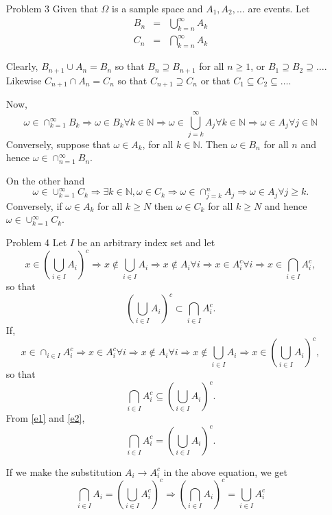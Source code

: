 \documentclass{article}
\newcommand{\son}{\mathbb{N}}
\begin{document}
\begin{enumerate}
\item[Problem 3] Given that $\Omega$ is a sample space and $A_1, A_2, \ldots$ are
events. Let
\begin{eqnarray*}
B_n &=& \bigcup_{k=n}^\infty A_k \\
C_n &=& \bigcap_{k=n}^\infty A_k
\end{eqnarray*}

Clearly, $B_{n+1} \cup A_{n} = B_{n}$ so that $B_n \supseteq B_{n+1}$ for all $n
\ge 1$, or $B_1 \supseteq B_2 \supseteq \ldots$. Likewise $C_{n+1} \cap A_{n} = 
C_n$ so that $C_{n+1} \supseteq C_n$ or that $C_1 \subseteq C_2 \subseteq \ldots$.

Now,
\[
\omega \in \cap_{k=1}^\infty B_k \Rightarrow \omega \in B_k \forall k \in \son
\Rightarrow \omega \in \bigcup_{j=k}^\infty A_j \forall k \in \son \Rightarrow
\omega \in A_j \forall j \in \son
\]
Conversely, suppose that $\omega \in A_k$, for all $k \in \son$. Then $\omega \in
B_n$ for all $n$ and hence $\omega \in \cap_{n=1}^\infty B_n$.

On the other hand
\[
\omega \in \cup_{k=1}^\infty C_k \Rightarrow \exists k \in \son, \omega \in C_k
\Rightarrow \omega \in \cap_{j=k}^n A_j \Rightarrow \omega \in A_j \forall j
\ge k.
\]
Conversely, if $\omega \in A_k$ for all $k \ge N$ then $\omega \in C_k$ for all
$k \ge N$ and hence $\omega \in \cup_{k=1}^\infty C_k$.

\item[Problem 4] Let $I$ be an arbitrary index set and let
\[
x \in \left(\bigcup_{i \in I}A_i\right)^c \Rightarrow x \notin \bigcup_{i \in I}A_i
\Rightarrow x \notin A_i \forall i \Rightarrow x \in A_i^c \forall i \Rightarrow 
x \in \bigcap_{i\in I}A_i^c,
\]
so that
\begin{equation}\label{e1}
\left(\bigcup_{i \in I}A_i\right)^c \subset \bigcap_{i\in I}A_i^c.
\end{equation}
If,
\[
x \in \cap_{i\in I}A_i^c \Rightarrow x \in A_i^c \forall i \Rightarrow
x \notin A_i \forall i \Rightarrow x \notin \bigcup_{i \in I}A_i
\Rightarrow x \in \left(\bigcup_{i \in I}A_i\right)^c,
\]
so that
\begin{equation}\label{e2}
\bigcap_{i\in I}A_i^c \subseteq \left(\bigcup_{i \in I}A_i\right)^c.
\end{equation}
From \eqref{e1} and \eqref{e2},
\[
\bigcap_{i\in I}A_i^c = \left(\bigcup_{i \in I}A_i\right)^c.
\]

If we make the substitution $A_i \rightarrow A_i^c$ in the above equation, we 
get
\[
\bigcap_{i\in I}A_i = \left(\bigcup_{i \in I}A_i^c\right)^c \Rightarrow
\left(\bigcap_{i \in I}A_i\right)^c = \bigcup_{i \in I}A_i^c
\]


\end{enumerate}
\end{document}

